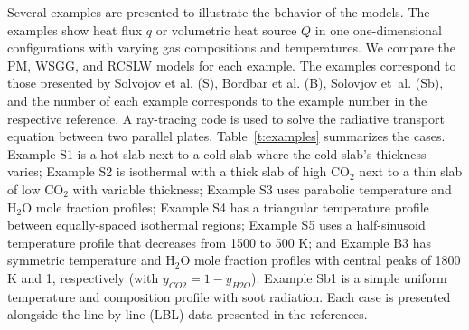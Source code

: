 \documentclass[preprint,12pt, a4paper]{elsarticle}
\begin{document}
Several examples are presented to illustrate the behavior of the models. The examples show heat flux $q$ or volumetric heat source $Q$ in one one-dimensional configurations with varying gas compositions and temperatures. We compare the PM, WSGG, and RCSLW models for each example. The examples correspond to those presented by Solvojov et al. \cite{Solovjov_2017} (S), Bordbar et al. \cite{Bordbar_2020} (B), Solovjov et~al. \cite{Solovjov_2001} (Sb), and the number of each example corresponds to the example number in the respective reference. A ray-tracing code is used to solve the radiative transport equation between two parallel plates. 
Table~\ref{t:examples} summarizes the cases. Example S1 is a hot slab next to a cold slab where the cold slab's thickness varies; Example S2 is isothermal with a thick slab of high CO$_2$ next to a thin slab of low CO$_2$ with variable thickness; Example S3 uses parabolic temperature and H$_2$O mole fraction profiles; Example S4 has a triangular temperature profile between equally-spaced isothermal regions; Example S5 uses a half-sinusoid temperature profile that decreases from 1500 to 500 K; and Example B3 has symmetric temperature and H$_2$O mole fraction profiles with central peaks of 1800 K and 1, respectively (with $y_{CO2}=1-y_{H2O}$). Example Sb1 is a simple uniform temperature and composition profile with soot radiation. Each case is presented alongside the line-by-line (LBL) data presented in the references. 
%
\end{document}
